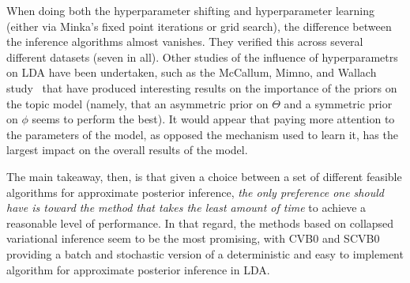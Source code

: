 \documentclass[11pt]{article}
\begin{document}
When doing both the hyperparameter shifting and hyperparameter learning
(either via Minka's fixed point iterations or grid search), the difference
between the inference algorithms almost vanishes. They verified this across
several different datasets (seven in all). Other studies of the influence
of hyperparametrs on LDA have been undertaken, such as the McCallum, Mimno,
and Wallach study~\cite{McCallum:2009:priorsmatter} that have produced
interesting results on the importance of the priors on the topic model
(namely, that an asymmetric prior on $\Theta$ and a symmetric prior on
$\phi$ seems to perform the best). It would appear that paying more
attention to the parameters of the model, as opposed the mechanism used to
learn it, has the largest impact on the overall results of the model.

The main takeaway, then, is that given a choice between a set of different
feasible algorithms for approximate posterior inference, \emph{the only
preference one should have is toward the method that takes the least amount
of time} to achieve a reasonable level of performance. In that regard, the
methods based on collapsed variational inference seem to be the most
promising, with CVB0 and SCVB0 providing a batch and stochastic version of
a deterministic and easy to implement algorithm for approximate posterior
inference in LDA.



\end{document}
